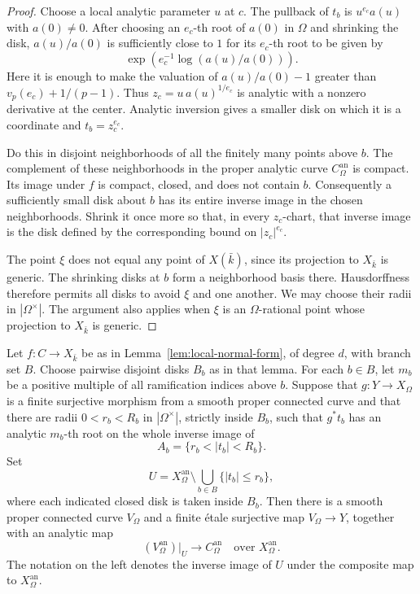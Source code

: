 \begin{proof}
Choose a local analytic parameter $u$ at $c$.  The pullback of $t_b$ is
$u^{e_c}a(u)$ with $a(0)\ne0$.  After choosing an $e_c$-th root of
$a(0)$ in $\Omega$ and shrinking the disk, $a(u)/a(0)$ is sufficiently
close to $1$ for its $e_c$-th root to be given by
\[
 \exp\!\left(e_c^{-1}\log(a(u)/a(0))\right).
\]
Here it is enough to make the valuation of $a(u)/a(0)-1$ greater than
$v_p(e_c)+1/(p-1)$.  Thus $z_c=u\,a(u)^{1/e_c}$ is analytic with a
nonzero derivative at the center.  Analytic inversion gives a smaller
disk on which it is a coordinate and $t_b=z_c^{e_c}$.

Do this in disjoint neighborhoods of all the finitely many points above
$b$.  The complement of these neighborhoods in the proper analytic curve
$C_\Omega^{\mathrm{an}}$ is compact.  Its image under $f$ is compact,
closed, and does not contain $b$.  Consequently a sufficiently small disk
about $b$ has its entire inverse image in the chosen neighborhoods.
Shrink it once more so that, in every $z_c$-chart, that inverse image is
the disk defined by the corresponding bound on $|z_c|^{e_c}$.

The point $\xi$ does not equal any point of $X(\bar k)$, since its
projection to $X_{\bar k}$ is generic.  The shrinking disks at $b$ form
a neighborhood basis there.  Hausdorffness therefore permits all disks
to avoid $\xi$ and one another.  We may choose their radii in
$|\Omega^\times|$.  The argument also applies when $\xi$ is an
$\Omega$-rational point whose projection to $X_{\bar k}$ is generic.
\end{proof}

\begin{proposition}\label{prop:patching}
Let $f:C\to X_{\bar k}$ be as in Lemma~\ref{lem:local-normal-form},
of degree $d$, with branch set $B$.  Choose pairwise disjoint disks $B_b$
as in that lemma.
For each $b\in B$, let $m_b$ be a positive multiple of all ramification
indices above $b$.  Suppose that $g:Y\to X_\Omega$ is a finite
surjective morphism from a smooth proper connected curve and that there
are radii $0<r_b<R_b$ in $|\Omega^\times|$, strictly inside $B_b$, such
that $g^*t_b$ has an analytic $m_b$-th root on the whole inverse image of
\[
                       A_b=\{r_b<|t_b|<R_b\}.
\]
Set
\[
 U=X_\Omega^{\mathrm{an}}\setminus
       \bigcup_{b\in B}\{|t_b|\le r_b\},
\]
where each indicated closed disk is taken inside $B_b$.
Then there is a smooth proper connected curve $V_\Omega$ and a finite
étale surjective map $V_\Omega\to Y$, together with an analytic map
\[
 (V_\Omega^{\mathrm{an}})|_U\longrightarrow C_\Omega^{\mathrm{an}}
 \quad\text{over }X_\Omega^{\mathrm{an}}.
\]
The notation on the left denotes the inverse image of $U$ under the
composite map to $X_\Omega^{\mathrm{an}}$.
\end{proposition}

